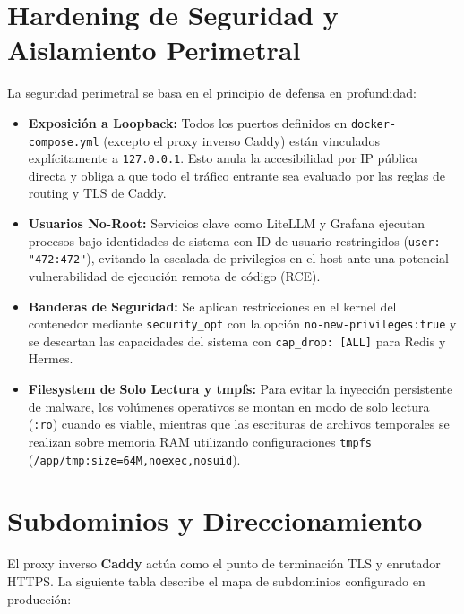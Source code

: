 \documentclass[12pt,a4paper,openany]{book}
\newcommand{\service}[1]{\textbf{\textsf{\color{hermesblue}#1}}}
\newcommand{\code}[1]{\texttt{\small#1}}
\begin{document}
\section{Hardening de Seguridad y Aislamiento Perimetral}
La seguridad perimetral se basa en el principio de defensa en profundidad:
\begin{itemize}
    \item \textbf{Exposición a Loopback:} Todos los puertos definidos en \code{docker-compose.yml} (excepto el proxy inverso Caddy) están vinculados explícitamente a \code{127.0.0.1}. Esto anula la accesibilidad por IP pública directa y obliga a que todo el tráfico entrante sea evaluado por las reglas de routing y TLS de Caddy.
    \item \textbf{Usuarios No-Root:} Servicios clave como LiteLLM y Grafana ejecutan procesos bajo identidades de sistema con ID de usuario restringidos (\code{user: "472:472"}), evitando la escalada de privilegios en el host ante una potencial vulnerabilidad de ejecución remota de código (RCE).
    \item \textbf{Banderas de Seguridad:} Se aplican restricciones en el kernel del contenedor mediante \code{security\_opt} con la opción \code{no-new-privileges:true} y se descartan las capacidades del sistema con \code{cap\_drop: [ALL]} para Redis y Hermes.
    \item \textbf{Filesystem de Solo Lectura y tmpfs:} Para evitar la inyección persistente de malware, los volúmenes operativos se montan en modo de solo lectura (\code{:ro}) cuando es viable, mientras que las escrituras de archivos temporales se realizan sobre memoria RAM utilizando configuraciones \code{tmpfs} (\code{/app/tmp:size=64M,noexec,nosuid}).
\end{itemize}

\section{Subdominios y Direccionamiento}
El proxy inverso \service{Caddy} actúa como el punto de terminación TLS y enrutador HTTPS. La siguiente tabla describe el mapa de subdominios configurado en producción:
\end{document}
